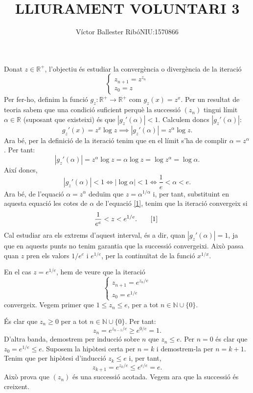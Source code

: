 \documentclass[11pt,a4paper]{article}
\title{\bfseries\large LLIURAMENT VOLUNTARI 3}
\author{Víctor Ballester Ribó\endgraf NIU:1570866}
\date{\parbox{\linewidth}{\centering
  Mètodes numèrics\endgraf
  Grau en Matemàtiques\endgraf
  Universitat Autònoma de Barcelona\endgraf
  Abril de 2021}}
\theoremstyle{definition}
\begin{document}
\maketitle
Donat $z\in\mathbb{R}^+$, l'objectiu és estudiar la convergència o divergència de la iteració
\begin{equation}
    \left\{\begin{array}{l}
        z_{n+1}=z^{z_n} \\
        z_0=z
    \end{array}\right.
    \label{iteracio}
\end{equation}
Per fer-ho, definim la funció $g_z:\mathbb{R}^+\rightarrow\mathbb{R}^+$ com $g_z(x)=z^x$. Per un resultat de teoria sabem que una condició suficient perquè la successió $(z_n)$ tingui límit $\alpha\in\mathbb{R}$ (suposant que existeixi) és que $|g_z'(\alpha)|<1$. Calculem doncs $|g_z'(\alpha)|$: $$g_z'(x)=z^x\log z\implies |g_z'(\alpha)|=z^\alpha\log z.$$ Ara bé, per la definició de la iteració tenim que en el límit s'ha de complir $\alpha=z^\alpha$. Per tant: $$|g_z'(\alpha)|=z^\alpha\log z=\alpha\log z=\log z^\alpha=\log\alpha.$$ Així doncs,
\begin{equation}
    |g_z'(\alpha)|<1\iff|\log\alpha|<1\iff\frac{1}{e}<\alpha<e.
    \label{1}
\end{equation}
Ara bé, de l'equació $\alpha=z^\alpha$ deduïm que $z=\alpha^{1/\alpha}$ i, per tant, substituint en aquesta equació les cotes de $\alpha$ de l'equació \eqref{1}, tenim que la iteració convergeix si $$\frac{1}{e^e}<z<e^{1/e}.\qquad\text{\cite{1} }$$ Cal estudiar ara els extrems d'aquest interval, és a dir, quan $|g_z'(\alpha)|=1$, ja que en aquests punts no tenim garantia que la successió convergeixi. Això passa quan $z$ pren els valors $1/e^e$ i $e^{1/e}$, per la continuïtat de la funció $x^{1/x}$.\par
En el cas $z=e^{1/e}$, hem de veure que la iteració
$$\left\{\begin{array}{l}
        z_{n+1}=e^{z_n/e} \\
        z_0=e^{1/e}
    \end{array}\right.$$
convergeix. Vegem primer que $1\leq z_n\leq e$, per a tot $n\in\mathbb{N}\cup\{0\}$.\par És clar que $z_n\geq 0$ per a tot $n\in\mathbb{N}\cup\{0\}$. Per tant: $$z_n=e^{z_{n-1}/e}\geq e^{0/e}=1.$$ D'altra banda, demostrem per inducció sobre $n$ que $z_n\leq e$. Per $n=0$ és clar que $z_0=e^{1/e}\leq e$. Suposem la hipòtesi certa per $n=k$ i demostrem-la per $n=k+1$. Tenim que per hipòtesi d'inducció $z_k\leq e$ i, per tant, $$z_{k+1}=e^{z_k/e}\leq e^{e/e}=e.$$ Això prova que $(z_n)$ és una successió acotada. Vegem ara que la successió és creixent.\par
\end{document}
